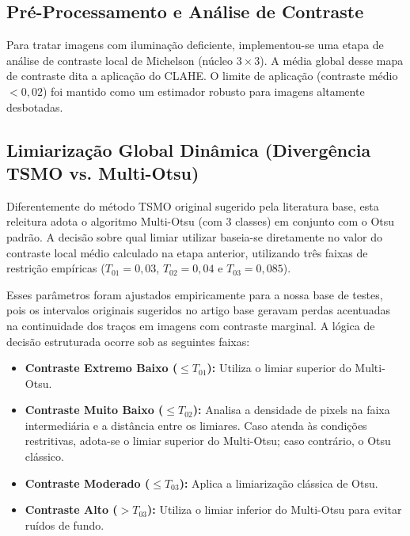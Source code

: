 \documentclass[conference]{IEEEtran}
\begin{document}
\subsection{Pré-Processamento e Análise de Contraste}
Para tratar imagens com iluminação deficiente, implementou-se uma etapa de análise de contraste local de Michelson (núcleo $3\times3$). A média global desse mapa de contraste dita a aplicação do CLAHE. O limite de aplicação (contraste médio $< 0,02$) foi mantido como um estimador robusto para imagens altamente desbotadas.

\subsection{Limiarização Global Dinâmica (Divergência TSMO vs. Multi-Otsu)}
Diferentemente do método TSMO original sugerido pela literatura base, esta releitura adota o algoritmo Multi-Otsu (com 3 classes) em conjunto com o Otsu padrão. A decisão sobre qual limiar utilizar baseia-se diretamente no valor do contraste local médio calculado na etapa anterior, utilizando três faixas de restrição empíricas ($T_{01} = 0,03$, $T_{02} = 0,04$ e $T_{03} = 0,085$). 

Esses parâmetros foram ajustados empiricamente para a nossa base de testes, pois os intervalos originais sugeridos no artigo base geravam perdas acentuadas na continuidade dos traços em imagens com contraste marginal. A lógica de decisão estruturada ocorre sob as seguintes faixas:

\begin{itemize}
    \item \textbf{Contraste Extremo Baixo ($\le T_{01}$):} Utiliza o limiar superior do Multi-Otsu.
    \item \textbf{Contraste Muito Baixo ($\le T_{02}$):} Analisa a densidade de pixels na faixa intermediária e a distância entre os limiares. Caso atenda às condições restritivas, adota-se o limiar superior do Multi-Otsu; caso contrário, o Otsu clássico.
    \item \textbf{Contraste Moderado ($\le T_{03}$):} Aplica a limiarização clássica de Otsu.
    \item \textbf{Contraste Alto ($> T_{03}$):} Utiliza o limiar inferior do Multi-Otsu para evitar ruídos de fundo.
\end{itemize}
\end{document}
